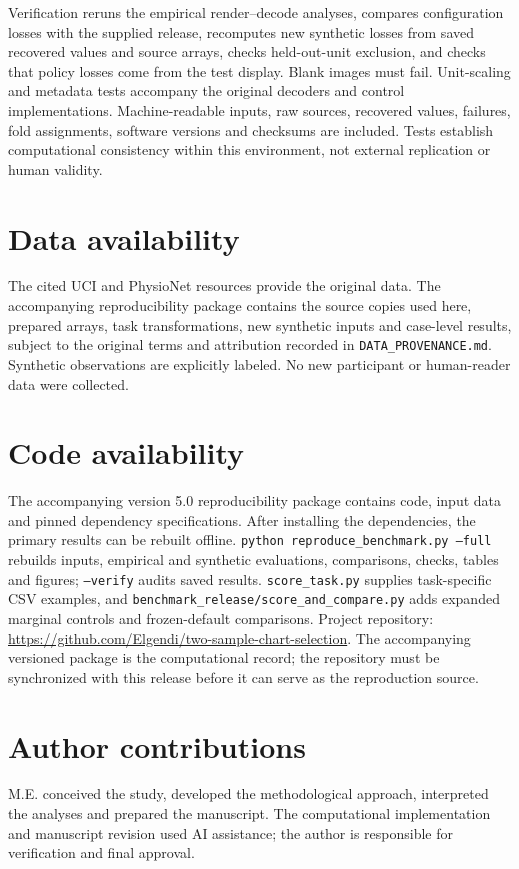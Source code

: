 \documentclass[11pt]{article}
\begin{document}
Verification reruns the empirical render--decode analyses, compares configuration losses with the supplied release, recomputes new synthetic losses from saved recovered values and source arrays, checks held-out-unit exclusion, and checks that policy losses come from the test display. Blank images must fail. Unit-scaling and metadata tests accompany the original decoders and control implementations. Machine-readable inputs, raw sources, recovered values, failures, fold assignments, software versions and checksums are included. Tests establish computational consistency within this environment, not external replication or human validity.

\section*{Data availability}
The cited UCI and PhysioNet resources provide the original data. The accompanying reproducibility package contains the source copies used here, prepared arrays, task transformations, new synthetic inputs and case-level results, subject to the original terms and attribution recorded in \texttt{DATA\_PROVENANCE.md}. Synthetic observations are explicitly labeled. No new participant or human-reader data were collected.

\section*{Code availability}
The accompanying version 5.0 reproducibility package contains code, input data and pinned dependency specifications. After installing the dependencies, the primary results can be rebuilt offline. \texttt{python reproduce\_benchmark.py --full} rebuilds inputs, empirical and synthetic evaluations, comparisons, checks, tables and figures; \texttt{--verify} audits saved results. \texttt{score\_task.py} supplies task-specific CSV examples, and \texttt{benchmark\_release/score\_and\_compare.py} adds expanded marginal controls and frozen-default comparisons. Project repository: \url{https://github.com/Elgendi/two-sample-chart-selection}. The accompanying versioned package is the computational record; the repository must be synchronized with this release before it can serve as the reproduction source.

\section*{Author contributions}
M.E. conceived the study, developed the methodological approach, interpreted the analyses and prepared the manuscript. The computational implementation and manuscript revision used AI assistance; the author is responsible for verification and final approval.
\end{document}
